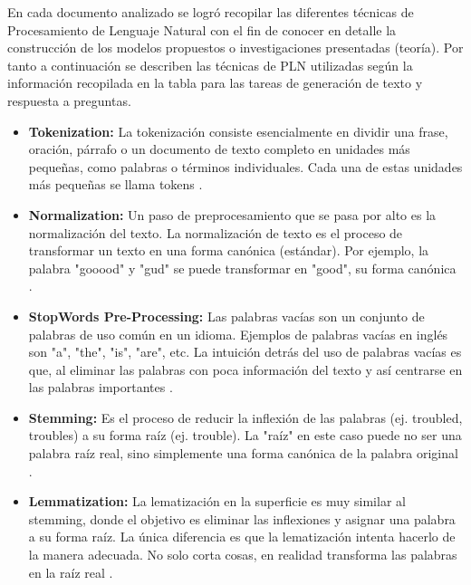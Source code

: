 \documentclass[../Main.tex]{subfiles}
\begin{document}
\begin{justify}
En cada documento analizado se logró recopilar las diferentes técnicas de Procesamiento de Lenguaje Natural con el fin de conocer en detalle la construcción de los modelos propuestos o investigaciones presentadas (teoría). Por tanto a continuación se describen las técnicas de PLN utilizadas según la información recopilada en la tabla para las tareas de generación de texto y respuesta a preguntas.
\end{justify}

\begin{itemize}
	\item \textbf{Tokenization:} La tokenización consiste esencialmente en dividir una frase, oración, párrafo o un documento de texto completo en unidades más pequeñas, como palabras o términos individuales. Cada una de estas unidades más pequeñas se llama tokens \cite{34}.\par
	
	\item \textbf{Normalization:} Un paso de preprocesamiento que se pasa por alto es la normalización del texto. La normalización de texto es el proceso de transformar un texto en una forma canónica (estándar). Por ejemplo, la palabra "gooood" y "gud" se puede transformar en "good", su forma canónica \cite{35}. \par

	\item \textbf{StopWords Pre-Processing:} Las palabras vacías son un conjunto de palabras de uso común en un idioma. Ejemplos de palabras vacías en inglés son "a", "the", "is", "are", etc. La intuición detrás del uso de palabras vacías es que, al eliminar las palabras con poca información del texto y así centrarse en las palabras importantes \cite{35}. \par

    \item \textbf{Stemming:} Es el proceso de reducir la inflexión de las palabras (ej. troubled, troubles) a su forma raíz  (ej. trouble). La "raíz" en este caso puede no ser una palabra raíz real, sino simplemente una forma canónica de la palabra original \cite{35}. \par
    
    \item \textbf{Lemmatization:} La lematización en la superficie es muy similar al stemming, donde el objetivo es eliminar las inflexiones y asignar una palabra a su forma raíz. La única diferencia es que la lematización intenta hacerlo de la manera adecuada. No solo corta cosas, en realidad transforma las palabras en la raíz real \cite{35}. \par
    

\end{itemize}
\end{document}
